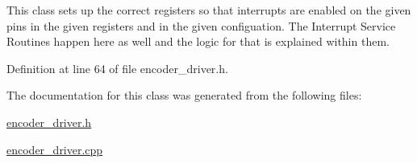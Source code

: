 This class sets up the correct registers so that interrupts are enabled on the given pins in the given registers and in the given configuation. The Interrupt Service Routines happen here as well and the logic for that is explained within them. 

Definition at line 64 of file encoder\-\_\-driver.\-h.



The documentation for this class was generated from the following files\-:\begin{DoxyCompactItemize}
\item 
\hyperlink{encoder__driver_8h}{encoder\-\_\-driver.\-h}\item 
\hyperlink{encoder__driver_8cpp}{encoder\-\_\-driver.\-cpp}\end{DoxyCompactItemize}
